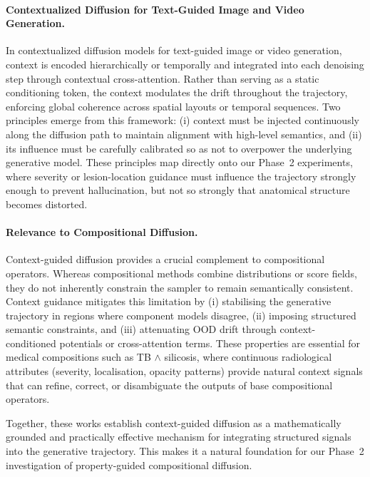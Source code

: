 \paragraph{Contextualized Diffusion for Text-Guided Image and Video Generation.}
In contextualized diffusion models for text-guided image or video generation,
context is encoded hierarchically or temporally and integrated into each
denoising step through contextual cross-attention. Rather than serving as a
static conditioning token, the context modulates the drift throughout the
trajectory, enforcing global coherence across spatial layouts or temporal
sequences. Two principles emerge from this framework: (i) context must be
injected continuously along the diffusion path to maintain alignment with
high-level semantics, and (ii) its influence must be carefully calibrated so as
not to overpower the underlying generative model. These principles map directly
onto our Phase~2 experiments, where severity or lesion-location guidance must
influence the trajectory strongly enough to prevent hallucination, but not so
strongly that anatomical structure becomes distorted.

\paragraph{Relevance to Compositional Diffusion.}
Context-guided diffusion provides a crucial complement to compositional
operators. Whereas compositional methods combine distributions or score fields,
they do not inherently constrain the sampler to remain semantically consistent.
Context guidance mitigates this limitation by  
(i) stabilising the generative trajectory in regions where component models
disagree,  
(ii) imposing structured semantic constraints, and  
(iii) attenuating OOD drift through context-conditioned potentials or
cross-attention terms.  
These properties are essential for medical compositions such as TB $\land$
silicosis, where continuous radiological attributes (severity, localisation,
opacity patterns) provide natural context signals that can refine, correct, or
disambiguate the outputs of base compositional operators.

Together, these works establish context-guided diffusion as a mathematically
grounded and practically effective mechanism for integrating structured signals
into the generative trajectory. This makes it a natural foundation for our
Phase~2 investigation of property-guided compositional diffusion.
